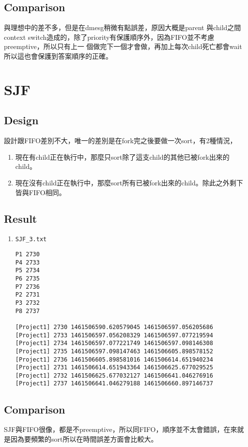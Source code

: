 \documentclass{article}
\begin{document}
\begin{CJK}{UTF8}{bkai}
\subsection{Comparison}
與理想中的差不多，但是在dmesg稍微有點誤差，原因大概是parent 與child之間context
switch造成的，除了priority有保護順序外，因為FIFO並不考慮preemptive，所以只有上一
個做完下一個才會做，再加上每次child死亡都會wait所以這也會保護到答案順序的正確。

\section{SJF}

\subsection{Design}
設計跟FIFO差別不大，唯一的差別是在fork完之後要做一次sort，有2種情況，
\begin{enumerate}
\item 現在有child正在執行中，那麼只sort除了這支child的其他已被fork出來的child。
\item 現在沒有child正在執行中，那麼sort所有已被fork出來的child。除此之外剩下皆與FIFO相同。
\end{enumerate}

\subsection{Result}
\begin{enumerate}
\item \texttt{SJF\_3.txt}
\begin{verbatim}
P1 2730
P4 2733
P5 2734
P6 2735
P7 2736
P2 2731
P3 2732
P8 2737

[Project1] 2730 1461506590.620579045 1461506597.056205686
[Project1] 2733 1461506597.056208329 1461506597.077219594
[Project1] 2734 1461506597.077221749 1461506597.098146308
[Project1] 2735 1461506597.098147463 1461506605.898578152
[Project1] 2736 1461506605.898581016 1461506614.651940234
[Project1] 2731 1461506614.651943364 1461506625.677029525
[Project1] 2732 1461506625.677032127 1461506641.046276916
[Project1] 2737 1461506641.046279188 1461506660.897146737
\end{verbatim}
\end{enumerate}

\subsection{Comparison}
SJF與FIFO很像，都是不preemptive，所以同FIFO，順序並不太會錯誤，在來就是因為要頻繁的sort所以在時間誤差方面會比較大。


\end{CJK}
\end{document}
